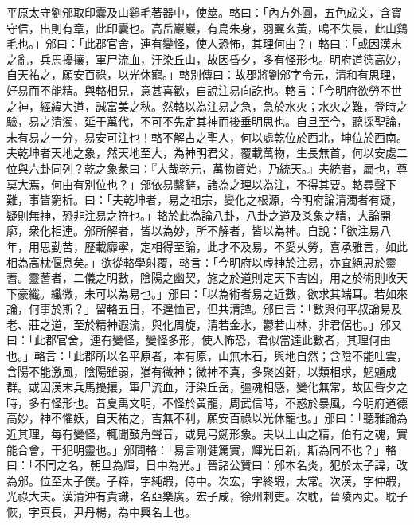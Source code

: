 \begin{pinyinscope}
平原太守劉邠取印囊及山鷄毛著器中，使筮。輅曰：「內方外圓，五色成文，含寶守信，出則有章，此印囊也。高岳巖巖，有鳥朱身，羽翼玄黃，鳴不失晨，此山鷄毛也。」邠曰：「此郡官舍，連有變怪，使人恐怖，其理何由？」輅曰：「或因漢末之亂，兵馬擾攘，軍尸流血，汙染丘山，故因昏夕，多有怪形也。明府道德高妙，自天祐之，願安百祿，以光休寵。」輅別傳曰：故郡將劉邠字令元，清和有思理，好易而不能精。與輅相見，意甚喜歡，自說注易向訖也。輅言：「今明府欲勞不世之神，經緯大道，誠富美之秋。然輅以為注易之急，急於水火；水火之難，登時之驗，易之清濁，延于萬代，不可不先定其神而後垂明思也。自旦至今，聽採聖論，未有易之一分，易安可注也！輅不解古之聖人，何以處乾位於西北，坤位於西南。夫乾坤者天地之象，然天地至大，為神明君父，覆載萬物，生長無首，何以安處二位與六卦同列？乾之象彖曰：『大哉乾元，萬物資始，乃統天。』夫統者，屬也，尊莫大焉，何由有別位也？」邠依易繫辭，諸為之理以為注，不得其要。輅尋聲下難，事皆窮析。曰：「夫乾坤者，易之祖宗，變化之根源，今明府論清濁者有疑，疑則無神，恐非注易之符也。」輅於此為論八卦，八卦之道及爻象之精，大論開廓，衆化相連。邠所解者，皆以為妙，所不解者，皆以為神。自說：「欲注易八年，用思勤苦，歷載靡寧，定相得至論，此才不及易，不愛乆勞，喜承雅言，如此相為高枕偃息矣。」欲從輅學射覆，輅言：「今明府以虛神於注易，亦宜絕思於靈蓍。靈蓍者，二儀之明數，陰陽之幽契，施之於道則定天下吉凶，用之於術則收天下豪纖。纖微，未可以為易也。」邠曰：「以為術者易之近數，欲求其端耳。若如來論，何事於斯？」留輅五日，不遑恤官，但共清譚。邠自言：「數與何平叔論易及老、莊之道，至於精神遐流，與化周旋，清若金水，鬱若山林，非君侶也。」邠又曰：「此郡官舍，連有變怪，變怪多形，使人怖恐，君似當達此數者，其理何由也。」輅言：「此郡所以名平原者，本有原，山無木石，與地自然；含陰不能吐雲，含陽不能激風，陰陽雖弱，猶有微神；微神不真，多聚凶姧，以類相求，魍魎成群。或因漢末兵馬擾攘，軍尸流血，汙染丘岳，彊魂相感，變化無常，故因昏夕之時，多有怪形也。昔夏禹文明，不怪於黃龍，周武信時，不惑於暴風，今明府道德高妙，神不懼妖，自天祐之，吉無不利，願安百祿以光休寵也。」邠曰：「聽雅論為近其理，每有變怪，輒聞鼓角聲音，或見弓劒形象。夫以土山之精，伯有之魂，實能合會，干犯明靈也。」邠問輅：「易言剛健篤實，輝光日新，斯為同不也？」輅曰：「不同之名，朝旦為輝，日中為光。」晉諸公贊曰：邠本名炎，犯於太子諱，改為邠。位至太子僕。子粹，字純嘏，侍中。次宏，字終嘏，太常。次漢，字仲嘏，光祿大夫。漢清沖有貴識，名亞樂廣。宏子咸，徐州刺吏。次耽，晉陵內史。耽子恢，字真長，尹丹楊，為中興名士也。


\end{pinyinscope}
